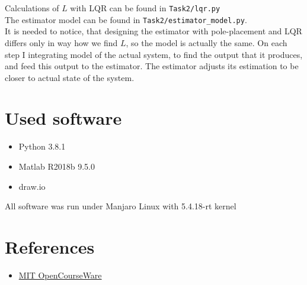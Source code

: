 \documentclass[a4paper,12pt]{article}
\begin{document}
Calculations of $L$ with LQR can be found in \texttt{Task2/lqr.py}\\
The estimator model can be found in \texttt{Task2/estimator\_model.py}.\\
It is needed to notice, that designing the estimator with pole-placement and LQR
differs only in way how we find $L$, so the model is actually the same. On each 
step I integrating model of the actual system, to find the output that it produces, 
and feed this output to the estimator. The estimator adjusts its estimation to
be closer to actual state of the system.


\section{Used software}
\begin{itemize}
    \item Python 3.8.1
    \item Matlab R2018b 9.5.0
    \item draw.io
\end{itemize}
All software was run under Manjaro Linux with 5.4.18-rt kernel
\section{References}
\begin{itemize}
    \item \href{https://ocw.mit.edu/courses/aeronautics-and-astronautics/16-30-feedback-control-systems-fall-2010/lecture-notes/MIT16_30F10_lec14.pdf}
    {MIT OpenCourseWare}
\end{itemize}
\end{document}
